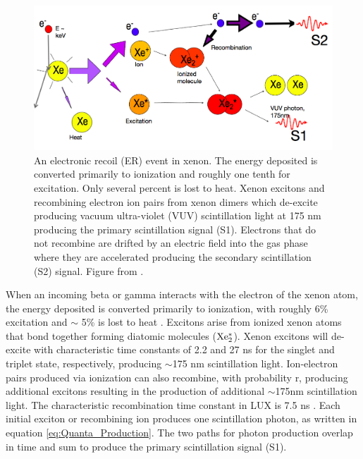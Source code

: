 \renewcommand{\baselinestretch}{1}
\small\normalsize
\begin{figure}[h!]\centering
\includegraphics[width=130mm]{Chapter_LUX_Det/ER_T_Shutt.png}
\caption{An electronic recoil (ER) event in xenon. The energy deposited is converted primarily to ionization and roughly one tenth for excitation. Only several percent is lost to heat. Xenon excitons and recombining electron ion pairs from xenon dimers which de-excite producing vacuum ultra-violet  (VUV) scintillation light at 175 nm producing the primary scintillation signal (S1). Electrons that do not recombine are drifted by an electric field into the gas phase where they are accelerated producing the secondary scintillation (S2) signal. Figure from \cite{T_Shutt}.}
\label{fig:TomS_ER}
\end{figure}
\renewcommand{\baselinestretch}{2}
\small\normalsize


\noindent When an incoming beta or gamma interacts with the electron of the xenon atom, the energy deposited is converted primarily to ionization,  with roughly 6\% excitation and $\sim$ 5\% is lost to heat \cite{alpha_xenon} \cite{FanoTheoretical}. Excitons arise from ionized xenon atoms that bond together forming diatomic molecules ($\rm Xe^*_2$). Xenon excitons will de-excite with characteristic time constants of 2.2 and 27 ns for the singlet and triplet state, respectively, producing $\sim$175 nm scintillation light. Ion-electron pairs produced via ionization can also recombine, with probability r, producing additional excitons resulting in the production of additional $\sim$175nm scintillation light. The characteristic recombination time constant in LUX is 7.5 ns \cite{Xe_Recombination_Time}. Each initial exciton or recombining ion produces one scintillation photon, as written in equation \ref{eq:Quanta_Production}. The two paths for photon production overlap in time and sum to produce the primary scintillation signal (S1). %

